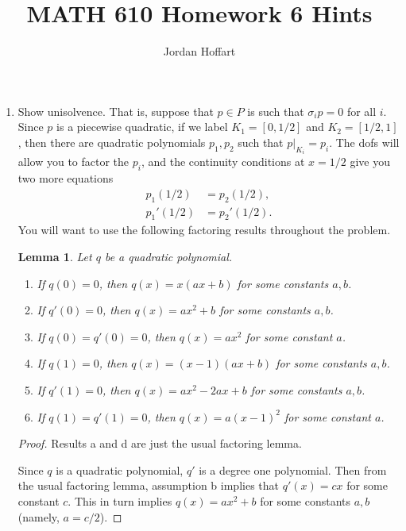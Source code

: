 \documentclass{article}
\title{MATH 610 Homework 6 Hints}
\author{Jordan Hoffart}
\date{}
\theoremstyle{plain}
\newtheorem{lemma}{Lemma}
\theoremstyle{definition}
\theoremstyle{remark}
\begin{document}
\maketitle
\begin{enumerate}
	\item
	      Show unisolvence.
	      That is, suppose that $p \in P$ is such that $\sigma_i p = 0$ for all $i$.
	      Since $p$ is a piecewise quadratic, if we label $K_1 = [0,1/2]$ and $K_2 = [1/2,1]$, then there are quadratic polynomials $p_1,p_2$ such that $p|_{K_i} = p_i$.
	      The dofs will allow you to factor the $p_i$, and the continuity conditions at $x = 1/2$ give you two more equations
	      \begin{align*}
		      p_1(1/2)  & = p_2(1/2),  \\
		      p_1'(1/2) & = p_2'(1/2).
	      \end{align*}
	      You will want to use the following factoring results throughout the problem.

	      \begin{lemma}
		      Let $q$ be a quadratic polynomial.
		      \begin{enumerate}
			      \item
			            If $q(0) = 0$, then $q(x) = x(ax+b)$ for some constants $a,b$.
			      \item
			            If $q'(0) = 0$, then $q(x) = ax^2 + b$ for some constants $a,b$.
			      \item
			            If $q(0) = q'(0) = 0$, then $q(x) = ax^2$ for some constant $a$.
			      \item
			            If $q(1) = 0$, then $q(x) = (x-1)(ax+b)$ for some constants $a,b$.
			      \item
			            If $q'(1) = 0$, then $q(x) = ax^2 - 2ax + b$ for some constants $a,b$.
			      \item
			            If $q(1) = q'(1) = 0$, then $q(x) = a(x-1)^2$ for some constant $a$.
		      \end{enumerate}
	      \end{lemma}
	      \begin{proof}
		      Results a and d are just the usual factoring lemma.

		      Since $q$ is a quadratic polynomial, $q'$ is a degree one polynomial.
		      Then from the usual factoring lemma, assumption b implies that $q'(x) = cx$ for some constant $c$.
		      This in turn implies $q(x) = ax^2 + b$ for some constants $a,b$ (namely, $a = c/2$).


\end{proof}
\end{enumerate}
\end{document}
